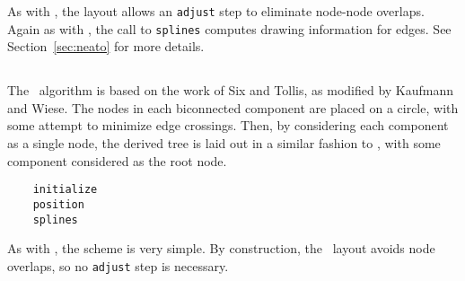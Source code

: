 As with \neato, the layout allows an {\tt adjust} step 
to eliminate node-node overlaps. Again as with \neato, the call to 
{\tt splines} computes drawing information for edges. See
Section~\ref{sec:neato} for more details.

\subsection{\circo}
\label{sec:circo}

The \circo\ algorithm is based on the work of Six and Tollis\cite{st,st2},
as modified by Kaufmann and Wiese\cite{kw}. The nodes in each 
biconnected component are placed on a circle, with some attempt to 
minimize edge crossings. Then, by considering each component as a single
node, the derived tree is laid out in a similar fashion to \twopi,
with some component considered as the root node.

\begin{verbatim}
    initialize
    position
    splines
\end{verbatim}

As with \fdp, the scheme is very simple.
By construction, the \circo\ layout avoids node overlaps, so no
{\tt adjust} step is necessary.

